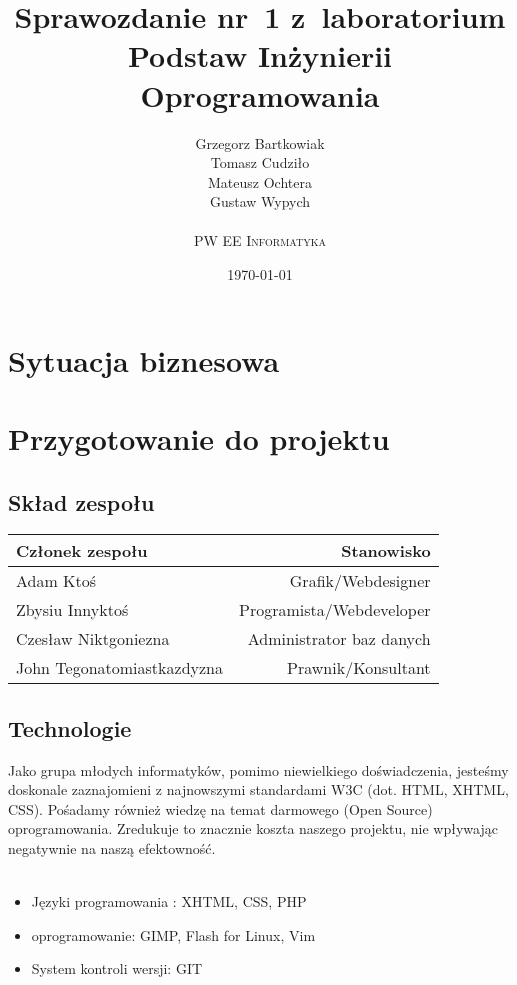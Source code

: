 \documentclass[10pt,a4paper]{article}
\begin{document}
\title{ 
  Sprawozdanie nr~1 z~laboratorium\\Podstaw Inżynierii Oprogramowania
}
\author{
  Grzegorz Bartkowiak\\
  Tomasz Cudziło\\
  Mateusz Ochtera\\
  Gustaw Wypych\\
  \\
  \textsc{PW EE Informatyka}\\[10pt]
}
\date{\today}

\maketitle

\section{Sytuacja biznesowa}

\section{Przygotowanie do projektu}
  \subsection{Skład zespołu}
    \begin{center}
    \begin{tabular}{ | l | r | }
       \hline
      \textbf{ Członek zespołu} &\textbf{ Stanowisko} \\ \hline \hline
       Adam Ktoś & Grafik/Webdesigner \\  \hline
       Zbysiu Innyktoś & Programista/Webdeveloper \\ \hline
       Czesław Niktgoniezna & Administrator baz danych \\ \hline
       John Tegonatomiastkazdyzna & Prawnik/Konsultant \\ \hline
     \end{tabular}
     \end{center}
  \subsection{Technologie}
  Jako grupa młodych informatyków, pomimo niewielkiego doświadczenia, jesteśmy doskonale zaznajomieni z najnowszymi  standardami W3C (dot. HTML, XHTML, CSS). Pośadamy również wiedzę na temat darmowego (Open Source) oprogramowania. Zredukuje to znacznie koszta naszego projektu, nie wpływając negatywnie na naszą efektowność.\\
\\
    \begin{itemize}
      \item Języki programowania : XHTML, CSS, PHP
      \item oprogramowanie: GIMP, Flash for Linux, Vim
      \item System kontroli wersji: GIT
    \end{itemize}
\end{document}
